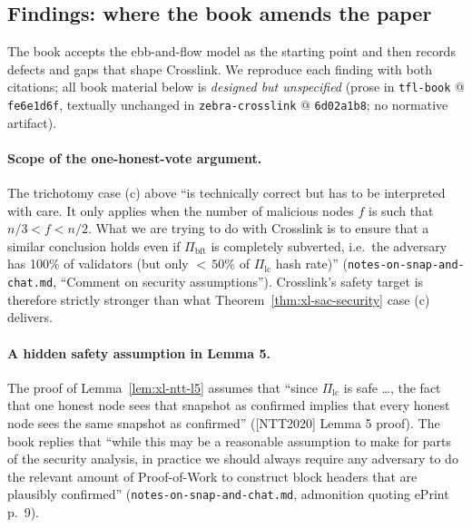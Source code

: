 \documentclass[11pt,a4paper]{article}
\theoremstyle{definition}
\begin{document}
\subsection{Findings: where the book amends the paper}
\label{sec:xl-book-findings}

The book accepts the ebb-and-flow model as the starting point and then
records defects and gaps that shape Crosslink. We reproduce each finding
with both citations; all book material below is \emph{designed but
unspecified} (prose in \texttt{tfl-book} @ \texttt{fe6e1d6f}, textually
unchanged in \texttt{zebra-crosslink} @ \texttt{6d02a1b8}; no normative
artifact).

\paragraph{Scope of the one-honest-vote argument.} The trichotomy case (c)
above ``is technically correct but has to be interpreted with care. It
only applies when the number of malicious nodes $f$ is such that
$n/3 < f < n/2$. What we are trying to do with Crosslink is to ensure that
a similar conclusion holds even if $\Pi_{\mathrm{bft}}$ is completely
subverted, i.e.\ the adversary has 100\% of validators (but only
${<}\,50\%$ of $\Pi_{\mathrm{lc}}$ hash rate)''
(\texttt{notes-on-snap-and-chat.md}, ``Comment on security
assumptions''). Crosslink's safety target is therefore strictly stronger
than what Theorem~\ref{thm:xl-sac-security} case (c) delivers.

\paragraph{A hidden safety assumption in Lemma 5.} The proof of
Lemma~\ref{lem:xl-ntt-l5} assumes that ``since $\Pi_{\mathrm{lc}}$ is safe
\dots, the fact that one honest node sees that snapshot as confirmed
implies that every honest node sees the same snapshot as confirmed''
([NTT2020] Lemma 5 proof). The book replies that ``while this may be a
reasonable assumption to make for parts of the security analysis, in
practice we should always require any adversary to do the relevant amount
of Proof-of-Work to construct block headers that are plausibly confirmed''
(\texttt{notes-on-snap-and-chat.md}, admonition quoting ePrint p.~9).
\end{document}
